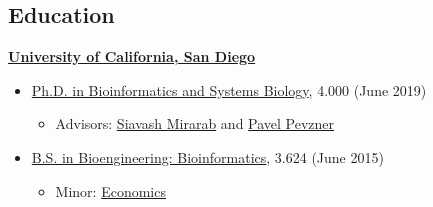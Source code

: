 \documentclass[margin,line]{res}
\begin{document}
\begin{resume}
\section{\sc Education}
{\bf \href{http://www.ucsd.edu/}{University of California, San Diego}}\\
\vspace*{-.1in}
\begin{itemize}
\item[] \hspace*{-2mm}\href{http://bioinformatics.ucsd.edu/}{Ph.D. in Bioinformatics and Systems Biology}, 4.000 (June 2019)
\begin{itemize}
\item Advisors: \href{http://eceweb.ucsd.edu/~smirarab/}{Siavash Mirarab} and \href{http://cseweb.ucsd.edu/~ppevzner/}{Pavel Pevzner}
\end{itemize}
\vspace*{0in}
\item[] \hspace*{-2mm}\href{http://be.ucsd.edu/bioinformatics}{B.S. in Bioengineering: Bioinformatics}, 3.624 (June 2015)
\begin{itemize}
\item Minor: \href{https://economics.ucsd.edu/undergraduate-program/major-minor-requirements/minors.html}{Economics}
\end{itemize}
\end{itemize}


\end{resume}
\end{document}
